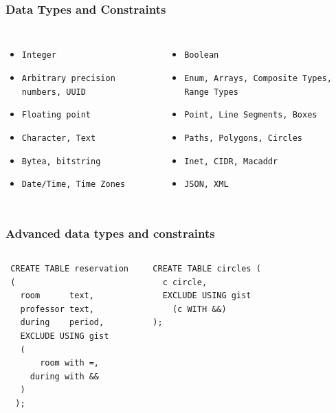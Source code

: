 \documentclass{beamer}
\begin{document}
\begin{frame}[fragile]
  \frametitle{Data Types and Constraints}

  \vfill
  
  \begin{columns}[c]

    \begin{itemize}
    \item \texttt{Integer}
    \item \texttt{Arbitrary precision numbers, UUID}
    \item \texttt{Floating point}
    \item \texttt{Character, Text}
    \item \texttt{Bytea, bitstring}
    \item \texttt{Date/Time, Time Zones}
    \end{itemize}  

    \begin{itemize}
    \item \texttt{Boolean}
    \item \texttt{Enum, Arrays, Composite Types, Range Types}
    \item \texttt{Point, Line Segments, Boxes}
    \item \texttt{Paths, Polygons, Circles}
    \item \texttt{Inet, CIDR, Macaddr}
    \item \texttt{JSON, XML}
    \end{itemize}

  \end{columns}
\end{frame}


\begin{frame}[fragile]
  \frametitle{Advanced data types and constraints}

\begin{columns}
  \begin{verbatim}
 CREATE TABLE reservation
 (
   room      text,
   professor text,
   during    period,
   EXCLUDE USING gist
   (
       room with =,
     during with &&
   )
  );
  \end{verbatim}
  \begin{verbatim}
  CREATE TABLE circles (
    c circle,
    EXCLUDE USING gist
      (c WITH &&)
  );
  \end{verbatim}
\end{columns}
\end{frame}
\end{document}
